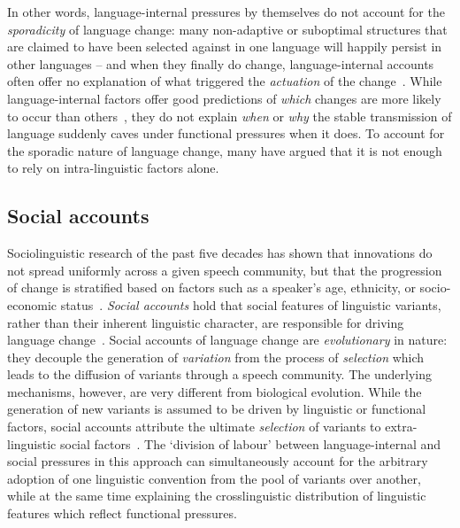 In other words, language-internal pressures by themselves do not account for the \emph{sporadicity} of language change: many non-adaptive or suboptimal structures that are claimed to have been selected against in one language will happily persist in other languages -- and when they finally do change, language-internal accounts often offer no explanation of what triggered the \emph{actuation} of the change~\citep{Saussure1959,Postal1968,Ohala1993}. While language-internal factors offer good predictions of \emph{which} changes are more likely to occur than others~\citep{Jaeger2010,Wedel2013short}, they do not explain \emph{when} or \emph{why} the stable transmission of language suddenly caves under functional pressures when it does. To account for the sporadic nature of language change, many have argued that it is not enough to rely on intra-linguistic factors alone.%

\subsection{Social accounts}

Sociolinguistic research of the past five decades has shown that innovations do not spread uniformly across a given speech community, but that the progression of change is stratified based on factors such as a speaker's age, ethnicity, or socio-economic status~\citep{Foulkes2006,Tagliamonte2012}. \emph{Social accounts} hold that social features of linguistic variants, rather than their inherent linguistic character, are responsible for driving language change~\citep{Sturtevant1947,Croft2000,Labov2001,Croft2006}. Social accounts of language change are \emph{evolutionary} in nature: they decouple the generation of \emph{variation} from the process of \emph{selection} which leads to the diffusion of variants through a speech community. 
The underlying mechanisms, however, are very different from biological evolution. While the generation of new variants is assumed to be driven by linguistic or functional factors, social accounts attribute the ultimate \emph{selection} of variants to extra-linguistic social factors~\citep{Ohala1989,Croft2000,Labov2001,Stevens2013}. The `division of labour' between language-internal and social pressures in this approach can simultaneously account for the arbitrary adoption of one linguistic convention from the pool of variants over another, while at the same time explaining the crosslinguistic distribution of linguistic features which reflect functional pressures.

